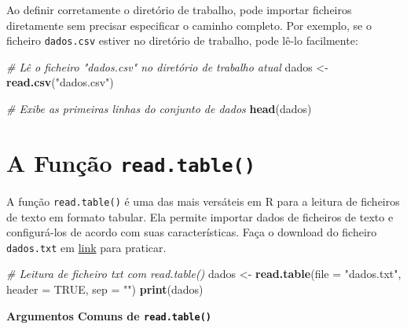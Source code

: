 \documentclass[
]{book}
\newenvironment{Shaded}{\begin{snugshade}}{\end{snugshade}}
\newcommand{\AttributeTok}[1]{\textcolor[rgb]{0.13,0.29,0.53}{#1}}
\newcommand{\CommentTok}[1]{\textcolor[rgb]{0.56,0.35,0.01}{\textit{#1}}}
\newcommand{\ConstantTok}[1]{\textcolor[rgb]{0.56,0.35,0.01}{#1}}
\newcommand{\FunctionTok}[1]{\textcolor[rgb]{0.13,0.29,0.53}{\textbf{#1}}}
\newcommand{\NormalTok}[1]{#1}
\newcommand{\OtherTok}[1]{\textcolor[rgb]{0.56,0.35,0.01}{#1}}
\newcommand{\StringTok}[1]{\textcolor[rgb]{0.31,0.60,0.02}{#1}}
\begin{document}
Ao definir corretamente o diretório de trabalho, pode importar ficheiros
diretamente sem precisar especificar o caminho completo. Por exemplo, se
o ficheiro \texttt{dados.csv} estiver no diretório de trabalho, pode lê-lo
facilmente:

\begin{Shaded}
\begin{Highlighting}[]
\CommentTok{\# Lê o ficheiro "dados.csv" no diretório de trabalho atual}
\NormalTok{dados }\OtherTok{\textless{}{-}} \FunctionTok{read.csv}\NormalTok{(}\StringTok{"dados.csv"}\NormalTok{)}

\CommentTok{\# Exibe as primeiras linhas do conjunto de dados}
\FunctionTok{head}\NormalTok{(dados)}
\end{Highlighting}
\end{Shaded}

\section{\texorpdfstring{A Função \texttt{read.table()}}{A Função read.table()}}\label{a-funuxe7uxe3o-read.table}

A função \texttt{read.table()} é uma das mais versáteis em R para a leitura de
ficheiros de texto em formato tabular. Ela permite importar dados de
ficheiros de texto e configurá-los de acordo com suas características.
Faça o download do ficheiro \texttt{dados.txt} em
\href{https://renatorpaula.wixsite.com/renato/laboratorio-estatistica}{link}
para praticar.

\begin{Shaded}
\begin{Highlighting}[]
\CommentTok{\# Leitura de ficheiro txt com read.table()}
\NormalTok{dados }\OtherTok{\textless{}{-}} \FunctionTok{read.table}\NormalTok{(}\AttributeTok{file =} \StringTok{"dados.txt"}\NormalTok{, }\AttributeTok{header =} \ConstantTok{TRUE}\NormalTok{, }\AttributeTok{sep =} \StringTok{""}\NormalTok{)}
\FunctionTok{print}\NormalTok{(dados)}
\end{Highlighting}
\end{Shaded}

\textbf{Argumentos Comuns de \texttt{read.table()}}
\end{document}
